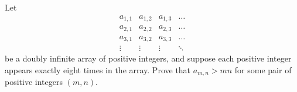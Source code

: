 Let
\[
\begin{array}{cccc} a_{1,1} & a_{1,2} & a_{1,3} & \dots \\
a_{2,1} & a_{2,2} & a_{2,3} & \dots \\
a_{3,1} & a_{3,2} & a_{3,3} & \dots \\
\vdots & \vdots & \vdots & \ddots
\end{array}
\]
be a doubly infinite array of positive integers, and suppose each
positive integer appears exactly eight times in the array. Prove that
$a_{m,n} > mn$ for some pair of positive integers $(m,n)$.
